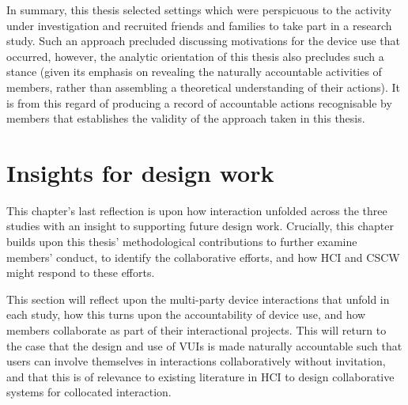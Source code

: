 \begin{revisedsubmission}
In summary, this thesis selected settings which were perspicuous to the activity under investigation and recruited friends and families to take part in a research study.
Such an approach precluded discussing motivations for the device use that occurred, however, the analytic orientation of this thesis also precludes such a stance (given its emphasis on revealing the naturally accountable activities of members, rather than assembling a theoretical understanding of their actions).
It is from this regard of producing a record of accountable actions recognisable by members that establishes the validity of the approach taken in this thesis.
\end{revisedsubmission}






\section{Insights for design work}\label{sec:synopsis discussion design}
\begin{revisedsubmission}
This chapter's last reflection is upon how interaction unfolded across the three studies with an insight to supporting future design work.
Crucially, this chapter builds upon this thesis' methodological contributions to further examine members' conduct, to identify the collaborative efforts, and how \ac{HCI} and \ac{CSCW} might respond to these efforts.

This section will reflect upon the multi-party device interactions that unfold in each study, how this turns upon the accountability of device use, and how members collaborate as part of their interactional projects.
This will return to the case that the design and use of \acp{VUI} is made naturally accountable such that users can involve themselves in interactions collaboratively without invitation, and that this is of relevance to existing literature in \ac{HCI} to design collaborative systems for collocated interaction.
\end{revisedsubmission}






